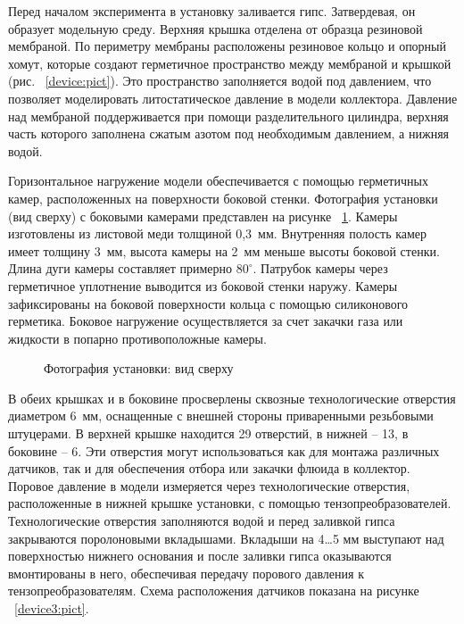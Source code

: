 Перед началом эксперимента в установку заливается гипс. Затвердевая, он образует модельную среду. Верхняя крышка отделена от образца резиновой мембраной. По периметру мембраны расположены резиновое кольцо и опорный хомут, которые создают герметичное пространство между мембраной и крышкой (рис. ~\ref{device:pict}). Это пространство заполняется водой под давлением, что позволяет моделировать литостатическое давление в модели коллектора. Давление над мембраной поддерживается при помощи разделительного цилиндра, верхняя часть которого заполнена сжатым азотом под необходимым давлением, а нижняя водой. 

Горизонтальное нагружение модели обеспечивается с помощью герметичных камер, расположенных на поверхности боковой стенки. Фотография установки (вид сверху) с боковыми камерами представлен на рисунке ~\ref{device2:pict}. Камеры изготовлены из листовой меди толщиной 0,3~мм. Внутренняя полость камер имеет толщину 3~мм, высота камеры на 2~мм меньше высоты боковой стенки. Длина дуги камеры составляет примерно $80^\circ$. Патрубок камеры через герметичное уплотнение выводится из боковой стенки наружу. Камеры зафиксированы на боковой поверхности кольца с помощью силиконового герметика. Боковое нагружение осуществляется за счет закачки газа или жидкости в попарно противоположные камеры.

\begin{figure}[hb]
\begin{center}
\end{center}
\caption{Фотография установки: вид сверху}\label{device2:pict}
\end{figure}

В обеих крышках и в боковине просверлены сквозные технологические отверстия диаметром 6~мм, оснащенные с внешней стороны приваренными резьбовыми штуцерами. В верхней крышке находится 29 отверстий, в нижней – 13, в боковине – 6. Эти отверстия могут использоваться как для монтажа различных датчиков, так и для обеспечения отбора или закачки флюида в коллектор. Поровое давление в модели измеряется через технологические отверстия, расположенные в нижней крышке установки, с помощью тензопреобразователей. Технологические отверстия заполняются водой и перед заливкой гипса закрываются поролоновыми вкладышами. Вкладыши на 4…5 мм выступают над поверхностью нижнего основания и после заливки гипса оказываются вмонтированы в него, обеспечивая передачу порового давления к тензопреобразователям. Схема расположения датчиков показана на рисунке ~\ref{device3:pict}.


